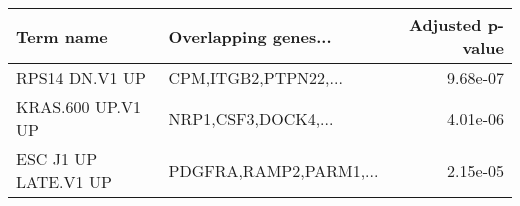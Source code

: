 \begin{tabular}{llr}
\toprule
           Term name &   Overlapping genes... &  Adjusted p-value \\
\midrule
      RPS14 DN.V1 UP &   CPM,ITGB2,PTPN22,... &          9.68e-07 \\
   KRAS.600 UP.V1 UP &    NRP1,CSF3,DOCK4,... &          4.01e-06 \\
ESC J1 UP LATE.V1 UP & PDGFRA,RAMP2,PARM1,... &          2.15e-05 \\
\bottomrule
\end{tabular}
